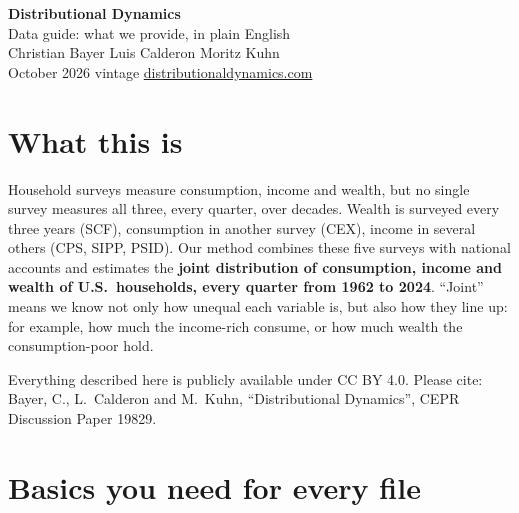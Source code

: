 \documentclass[11pt]{article}
\begin{document}
\begin{center}
{\LARGE\bfseries\color{accent} Distributional Dynamics}\\[4pt]
{\Large Data guide: what we provide, in plain English}\\[10pt]
Christian Bayer \quad Luis Calderon \quad Moritz Kuhn\\[2pt]
October 2026 vintage \quad\textbullet\quad \href{https://www.distributionaldynamics.com}{distributionaldynamics.com}
\end{center}

\section{What this is}

Household surveys measure consumption, income and wealth, but no single survey measures all three,
every quarter, over decades. Wealth is surveyed every three years (SCF), consumption in another survey
(CEX), income in several others (CPS, SIPP, PSID). Our method combines these five surveys with national
accounts and estimates the \textbf{joint distribution of consumption, income and wealth of U.S.\
households, every quarter from 1962 to 2024}. ``Joint'' means we know not only how unequal each
variable is, but also how they line up: for example, how much the income-rich consume, or how much
wealth the consumption-poor hold.

Everything described here is publicly available under CC BY 4.0. Please cite:
Bayer, C., L.\ Calderon and M.\ Kuhn, ``Distributional Dynamics'', CEPR Discussion Paper 19829.

\section{Basics you need for every file}
\end{document}
